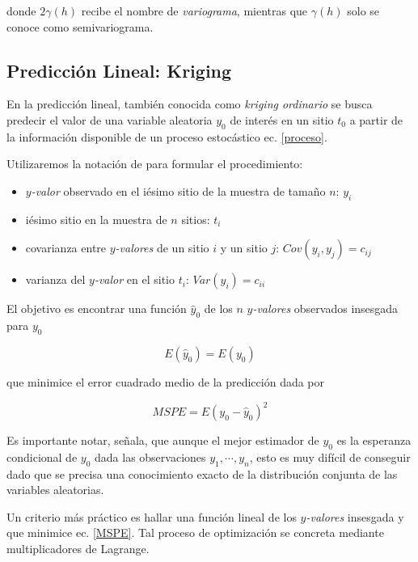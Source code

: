 \documentclass[14pt]{extarticle}
\begin{document}
\noindent donde $2\gamma(h)$ recibe el nombre de \textit{variograma}, mientras que $\gamma(h)$ solo se conoce como semivariograma\cite{Thompson.2012, Cressie.1986, Benedetti.2015}. 

\subsection{Predicción Lineal: Kriging}
En la predicción lineal, también conocida como \textit{kriging ordinario}\cite{Cressie.1986, Brus.2022} se busca predecir el valor de una variable aleatoria $y_0$ de interés en un sitio $t_0$ a partir de la información disponible de un proceso estocástico ec. \ref{proceso}\cite{Hohn.1993}. 

Utilizaremos la notación de \cite{Thompson.2012} para formular el procedimiento:
\begin{itemize}
	\item \textit{$y$-valor} observado en el iésimo sitio de la muestra de tamaño $n$: $y_i$
	\item iésimo sitio en la muestra de $n$ sitios: $t_i$
	\item covarianza entre \textit{$y$-valores} de un sitio $i$ y un sitio $j$: $Cov(y_i, y_j) = c_{ij}$
	\item varianza del \textit{$y$-valor} en el sitio $t_i$: $Var(y_i) = c_{ii}$	
\end{itemize}

El objetivo es encontrar una función $\hat{y}_0$ de los $n$ \textit{$y$-valores} observados insesgada para $y_0$

\begin{equation}
	E\left(\hat{y}_0\right) = E\left(y_0\right)\label{insesgadeza}
\end{equation}

\noindent que minimice el error cuadrado medio de la predicción dada por

\begin{equation}
	MSPE = E\left(y_0 - \hat{y}_0\right)^2\label{MSPE}
\end{equation}

Es importante notar, señala\cite{Thompson.2012}, que aunque el mejor estimador de $y_0$ es la esperanza condicional de $y_0$ dada las observaciones $y_1, \cdots, y_n$, esto es muy difícil de conseguir dado que se precisa una conocimiento exacto de la distribución conjunta de las variables aleatorias. 

Un criterio más práctico es hallar una función lineal de los \textit{$y$-valores} insesgada y que minimice ec. \ref{MSPE}. Tal proceso de optimización se concreta mediante multiplicadores de Lagrange\cite{Thompson.2012, Brus.2022}. 
\end{document}
